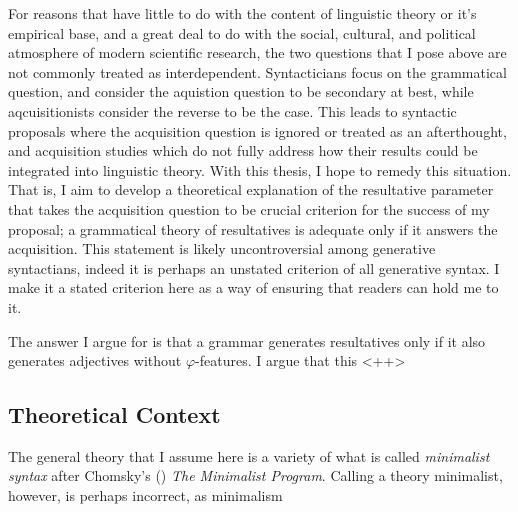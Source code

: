 \documentclass[MilwayThesis]{subfiles}
\begin{document}
For reasons that have little to do with the content of linguistic theory or it's empirical base, and a great deal to do with the social, cultural, and political atmosphere of modern scientific research, the two questions that I pose above are not commonly treated as interdependent.
Syntacticians focus on the grammatical question, and consider the aquistion question to be secondary at best, while aqcuisitionists consider the reverse to be the case.
This leads to syntactic proposals where the acquisition question is ignored or treated as an afterthought, and acquisition studies which do not fully address how their results could be integrated into linguistic theory.
With this thesis, I hope to remedy this situation.
That is, I aim to develop a theoretical explanation of the resultative parameter that takes the acquisition question to be crucial criterion for the success of my proposal; a grammatical theory of resultatives is adequate only if it answers the acquisition.
This statement is likely uncontroversial among generative syntactians, indeed it is perhaps an unstated criterion of all generative syntax.
I make it a stated criterion here as a way of ensuring that readers can hold me to it.

The answer I argue for is that a grammar generates resultatives only if it also generates adjectives without $\varphi$-features.
I argue that this <++>

\subsection{Theoretical Context}
The general theory that I assume here is a variety of what is called \textit{minimalist syntax} after Chomsky's (\citeyear{chomsky1995minimalist}) \textit{The Minimalist Program}.
Calling a theory minimalist, however, is perhaps incorrect, as minimalism 
\end{document}
